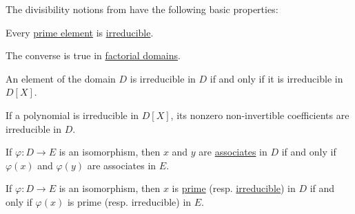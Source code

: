 \begin{proposition}\label{thm:def:domain_divisibility}
  The divisibility notions from  have the following basic properties:
  \begin{thmenum}
     Every \hyperref[def:domain_divisibility/prime]{prime element} is \hyperref[def:domain_divisibility/irreducible]{irreducible}.

    The converse is true in \hyperref[def:factorial_domain]{factorial domains}.

     An element of the domain \( D \) is irreducible in \( D \) if and only if it is irreducible in \( D[X] \).

     If a polynomial is irreducible in \( D[X] \), its nonzero non-invertible coefficients are irreducible in \( D \).

     If \( \varphi: D \to E \) is an isomorphism, then \( x \) and \( y \) are \hyperref[def:domain_divisibility/associates]{associates} in \( D \) if and only if \( \varphi(x) \) and \( \varphi(y) \) are associates in \( E \).

     If \( \varphi: D \to E \) is an isomorphism, then \( x \) is \hyperref[def:domain_divisibility/prime]{prime} (resp. \hyperref[def:domain_divisibility/irreducible]{irreducible}) in \( D \) if and only if \( \varphi(x) \) is prime (resp. irreducible) in \( E \).
  \end{thmenum}
\end{proposition}
